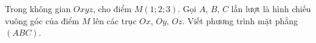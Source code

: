 \begin{ex}
Trong không gian $Oxyz$, cho điểm $M(1;2;3)$. Gọi $A$, $B$, $C$ lần lượt là hình chiếu vuông góc của điểm $M$ lên các trục $Ox$, $Oy$, $Oz$. Viết phương trình mặt phẳng $(ABC)$.
\end{ex}

